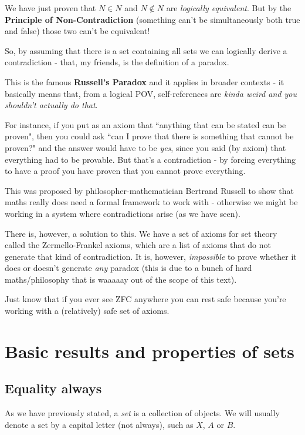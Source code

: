 We have just proven that $N\in N$ and $N\notin N$ are \textit{logically equivalent}. But by the \textbf{Principle of Non-Contradiction} (something can't be simultaneously both true and false) those two can't be equivalent!

So, by assuming that there is a set containing all sets we can logically derive a contradiction - that, my friends, is the definition of a paradox.

This is the famous \textbf{Russell's Paradox} and it applies in broader contexts - it basically means that, from a logical POV, self-references are \textit{kinda weird and you shouldn't actually do that}.

For instance, if you put as an axiom that ``anything that can be stated can be proven", then you could ask ``can I prove that there is something that cannot be proven?" and the answer would have to be \textit{yes}, since you said (by axiom) that everything had to be provable. But that's a contradiction - by forcing everything to have a proof you have proven that you cannot prove everything.

This was proposed by philosopher-mathematician Bertrand Russell to show that maths really does need a formal framework to work with - otherwise we might be working in a system where contradictions arise (as we have seen).

There is, however, a solution to this. We have a set of axioms for set theory called the Zermello-Frankel axioms, which are a list of axioms that do not generate that kind of contradiction. It is, however, \textit{impossible} to prove whether it does or doesn't generate \textit{any} paradox (this is due to a bunch of hard maths/philosophy that is waaaaay out of the scope of this text).

Just know that if you ever see ZFC anywhere you can rest safe because you're working with a (relatively) safe set of axioms.

\section{Basic results and properties of sets}
\subsection{Equality always}

As we have previously stated, a \textit{set} is a collection of objects. We will usually denote a set by a capital letter (not always), such as $X$, $A$ or $B$.

